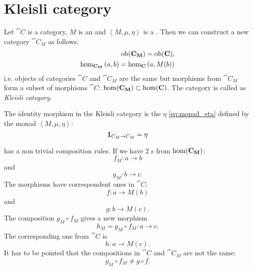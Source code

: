 \chapter{Kleisli category}

\begin{definition}
\label{def:kleisli_category}
Let $\cat{C}$ is a category, $M$ is an  and
$\left<M, \mu, \eta\right>$ is a . Then we can
construct a new category $\cat{C_M}$ as follows:
\begin{eqnarray}
\catob{C_M} = \catob{C},
\nonumber \\
\catmset[C_M]{a}{b} =
\catmset[C]{a}{M(b)} 
\nonumber
\end{eqnarray}
i.e. objects of categories $\cat{C}$ and $\cat{C_M}$ are the same but
morphisms from $\cat{C_M}$ form a subset of morphisms $\cat{C}$:
$\mathrm{hom}(\mathbf{C_M}) \subset \mathrm{hom}(\mathbf{C})$. The category is called as
\textit{Kleisli category}. 

The identity morphism in the Kleisli category is the
 $\eta$ \eqref{eq:monad_eta} defined by the monad
$\left<M, \mu, \eta\right>$: 
\[
\mathbf{1}_{ C_M \to C_M } = \eta
\]
\end{definition}

\begin{remark}
 has a non trivial composition rules.
If we have 2 s from $\mathrm{hom}(\mathbf{C_M})$:
\[
f_M: a \to b
\]
and
\[
g_M: b \to c.
\]
The morphisms have correspondent ones in $\cat{C}$:
\[
f: a \to M(b)
\]
and
\[
g: b \to M(c).
\]
The composition $g_M \circ f_M$ gives a new morphism
\[
h_M = g_M \circ f_M: a \to c.
\]
The corresponding one from $\cat{C}$ is
\[
h: a \to M(c).
\]
It has to be pointed that the compositions in $\cat{C}$ and
$\cat{C_M}$ are not the same:
\[
g_M \circ f_M \ne g \circ f.
\]
\end{remark}

